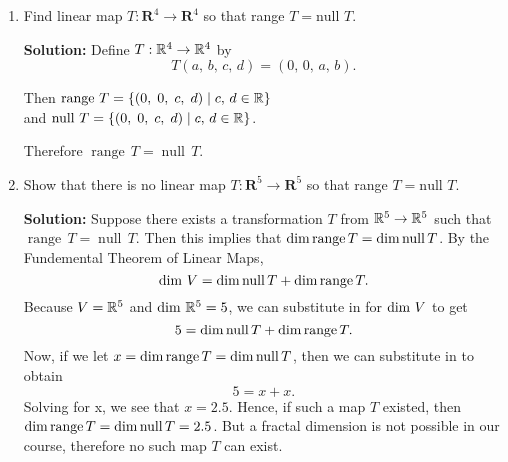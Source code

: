 \begin{enumerate}
    \item Find linear map $T : \mathbf{R}^4 \to \mathbf{R}^4$ so that range $T = \text{null } T$.\vspace{0.4in}
    \begin{mybox}
        \textbf{Solution: } Define $T : \mathbb{R}^4 \to \mathbb{R}^4$ by
        $$T(a, \,b,\,c,\,d) = (0,\,0,\,a,\,b).$$
        
        \nl Then $\operatorname{range}\,T = \{(0,\;0,\;c,\;d) \mid c,\, d \in \mathbb{R}\}$ \\and $\operatorname{null}\,T = \{(0,\;0,\;c,\;d) \mid c,\, d \in \mathbb{R}\}$.
        
        \nl Therefore $\operatorname{range}\,T = \operatorname{null}\,T$.
    \end{mybox}
    \vspace{1in}
    \item Show that there is no linear map $T : \mathbf{R}^5 \to \mathbf{R}^5$ so that range $T = \text{null } T$.\vspace{0.4in}
    \begin{mybox}
        \textbf{Solution: } Suppose there exists a transformation $T$ from $\mathbb{R}^5 \to \mathbb{R}^5$ such that $\operatorname{range}\,T = \operatorname{null}\,T$. Then this implies that $\operatorname{dim}\operatorname{range}{T} = \operatorname{dim}\operatorname{null}{T}$. By the Fundemental Theorem of Linear Maps,
        $$\operatorname{dim}\,{V} = \operatorname{dim}\operatorname{null}{T} + \operatorname{dim}\operatorname{range}{T}.$$
        Because $V = \mathbb{R}^5$ and $\operatorname{dim}\,{\mathbb{R}^5} = 5$, we can substitute in for $\operatorname{dim}\,{V}$ to get
        $$5 = \operatorname{dim}\operatorname{null}{T} + \operatorname{dim}\operatorname{range}{T}.$$
        Now, if we let $x = \operatorname{dim}\operatorname{range}{T} = \operatorname{dim}\operatorname{null}{T}$, then we can substitute in to obtain
        $$5 = x + x.$$
        Solving for x, we see that $x = 2.5$. Hence, if such a map $T$ existed, then $\operatorname{dim}\operatorname{range}{T} = \operatorname{dim}\operatorname{null}{T} = 2.5$. But a fractal dimension is not possible in our course, therefore no such map $T$ can exist.
    \end{mybox}
    \end{enumerate}